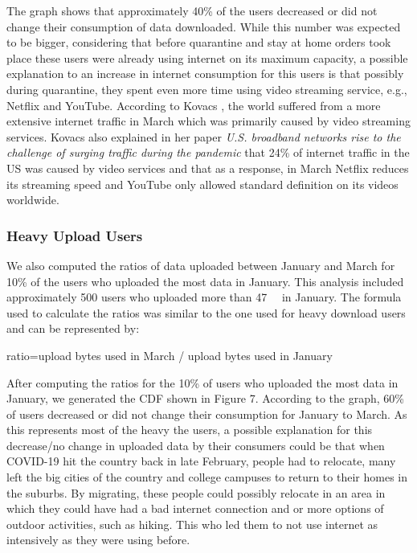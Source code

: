 \documentclass[conference,10pt]{IEEEtran}
\begin{document}
The graph shows that approximately 40\% of the users decreased or did not change their consumption of data downloaded. While this number was expected to be bigger, considering that before quarantine and stay at home orders took place these users were already using internet on its maximum capacity, a possible explanation to an increase in internet consumption for this users is that possibly during quarantine, they spent even more time using video streaming service, e.g., Netflix and YouTube. According to Kovacs \cite{kovacs}, the world suffered from a more extensive internet traffic in March which was primarily caused by video streaming services. Kovacs also explained in her paper \textit{U.S. broadband networks rise to the challenge of surging traffic during the pandemic} that 24\% of internet traffic in the US was caused by video services and that as a response, in March Netflix reduces its streaming speed and YouTube only allowed standard definition on its videos worldwide.

\subsubsection{Heavy Upload Users}
\label{sec:heavy-upload-users}

We also computed the ratios of data uploaded between January and March for 10\% of the users who uploaded the most data in January. This analysis included approximately 500 users who uploaded more than \SI{47}{\giga\byte} in January. The formula used to calculate the ratios was similar to the one used for heavy download users and can be represented by:

ratio=upload bytes used in March / upload bytes used in January

After computing the ratios for the 10\% of users who uploaded the most data in January, we generated the CDF shown in Figure 7. According to the graph, 60\% of users decreased or did not change their consumption for January to March. As this represents most of the heavy the users, a possible explanation for this decrease/no change in uploaded data by their consumers could be that when COVID-19 hit the country back in late February, people had to relocate, many left the big cities of the country and college campuses to return to their homes in the suburbs. By migrating, these people could possibly relocate in an area in which they could have had a bad internet connection and or more options of outdoor activities, such as hiking. This who led them to not use internet as intensively as they were using before.
\end{document}
